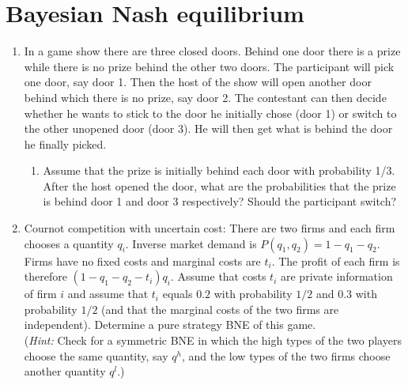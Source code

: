 \documentclass[a4paper,12pt]{article}
\begin{document}
\section{Bayesian Nash equilibrium}
\label{sec:bayes-nash-equil}

\begin{enumerate}[resume]
\item In a game show there are three closed doors. Behind one door there is a prize while there is no prize behind the other two doors. The participant will pick one door, say door 1. Then the host of the show will open another door behind which there is no prize, say door 2. The contestant can then decide whether he wants to stick to the door he initially chose (door 1) or switch to the other unopened door (door 3). He will then get what is behind the door he finally picked.
  \begin{enumerate}
  \item Assume that the prize is initially behind each door with probability 1/3. After the host opened the door, what are the probabilities that the prize is behind door 1 and door 3 respectively? Should the participant switch?
  \end{enumerate}
\item Cournot competition with uncertain cost: There are two firms and each firm chooses a quantity $q_i$. Inverse market demand is $P(q_1,q_2)=1-q_1-q_2$. Firms have no fixed costs and marginal costs are $t_i$. The profit of each firm is therefore $(1-q_1-q_2-t_i)q_i$. Assume that costs $t_i$ are private information of firm $i$ and assume that $t_i$ equals $0.2$ with probability $1/2$ and $0.3$ with probability $1/2$ (and that the marginal costs of the two firms are independent). Determine a pure strategy BNE of this game.\\
  (\emph{Hint: }Check for a symmetric BNE in which the high types of the two players choose the same quantity, say $q^h$, and the low types of the two firms choose another quantity $q^l$.)

\end{enumerate}
\end{document}
